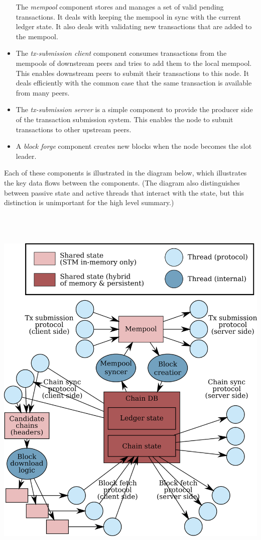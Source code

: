 \documentclass[11pt,a4paper]{article}
\begin{document}
\begin{itemize}
  The \emph{mempool} component stores and manages a set of valid pending
  transactions. It deals with keeping the mempool in sync with the
  current ledger state. It also deals with validating new transactions
  that are added to the mempool.
\item
  The \emph{tx-submission client} component consumes transactions from
  the mempools of downstream peers and tries to add them to the local
  mempool. This enables downstream peers to submit their transactions to
  this node. It deals efficiently with the common case that the same
  transaction is available from many peers.
\item
  The \emph{tx-submission server} is a simple component to provide the
  producer side of the transaction submission system. This enables the
  node to submit transactions to other upstream peers.
\item
  A \emph{block forge} component creates new blocks when the node
  becomes the slot leader.
\end{itemize}

Each of these components is illustrated in the diagram below, which
illustrates the key data flows between the components. (The diagram also
distinguishes between passive state and active threads that interact
with the state, but this distinction is unimportant for the high level
summary.)

\includegraphics[width=6.27083in,height=7.25347in]{./media/image8.png}
\end{document}
